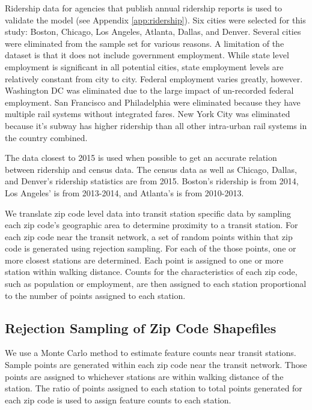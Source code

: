 \documentclass[11pt]{article}
\begin{document}
Ridership data for agencies that publish annual ridership reports is used to validate the model (see Appendix \ref{app:ridership}). Six cities were selected for this study: Boston, Chicago, Los Angeles, Atlanta, Dallas, and Denver. Several cities were eliminated from the sample set for various reasons. A limitation of the dataset is that it does not include government employment. While state level employment is significant in all potential cities, state employment levels are relatively constant from city to city. Federal employment varies greatly, however. Washington DC was eliminated due to the large impact of un-recorded federal employment. San Francisco and Philadelphia were eliminated because they have multiple rail systems without integrated fares. New York City was eliminated because it's subway has higher ridership than all other intra-urban rail systems in the country combined. 

The data closest to 2015 is used when possible to get an accurate relation between ridership and census data. The census data as well as Chicago, Dallas, and Denver's ridership statistics are from 2015. Boston's ridership is from 2014, Los Angeles' is from 2013-2014, and Atlanta's is from 2010-2013. 

We translate zip code level data into transit station specific data by sampling each zip code's geographic area to determine proximity to a transit station. For each zip code near the transit network, a set of random points within that zip code is generated using rejection sampling. For each of the those points, one or more closest stations are determined. Each point is assigned to one or more station within walking distance. Counts for the characteristics of each zip code, such as population or employment, are then assigned to each station proportional to the number of points assigned to each station.

\subsection{Rejection Sampling of Zip Code Shapefiles}

We use a Monte Carlo method to estimate feature counts near transit stations. Sample points are generated within each zip code near the transit network. Those points are assigned to whichever stations are within walking distance of the station. The ratio of points assigned to each station to total points generated for each zip code is used to assign feature counts to each station.
\end{document}
